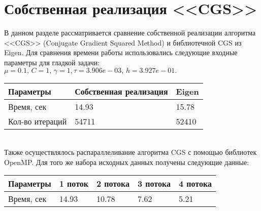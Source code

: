 \newpage
\section{Собственная реализация <<CGS>>}
В данном разделе рассматривается сравнение собственной реализации алгоритма <<CGS>> (Conjugate Gradient Squared Method) и библиотечной CGS из Eigen. Для сравнения времени работы использовались следующие входные параметры для гладкой задачи: $\mu=0.1, \, C=1,\, \gamma=1, \tau=3.906e-03, \, h=3.927e-01$$.$

\centering
\begin{tabular}{|p{2in}|p{1.1in}|p{1in}|} \hline
	Параметры & Собственная реализация &Eigen\\ \hline 
	Время, сек& 14.93 & 15.78\\ \hline 
	Кол-во итераций & 54711 & 52410 \\ \hline 
\end{tabular}\\[20pt]

Также осуществлялось распараллеливание алгоритма CGS с помощью библиотек OpenMP. Для того же набора исходных данных получены следующие данные:

\centering
\begin{tabular}{|p{2in}|p{1.1in}|p{1in}|p{1in}|p{1in}|} \hline
	Параметры & 1 поток &2 потока &3 потока & 4 потока\\ \hline 
	Время, сек& 14.93 & 10.78 & 7.62 & 5.21\\ \hline 
\end{tabular}\\[20pt]

